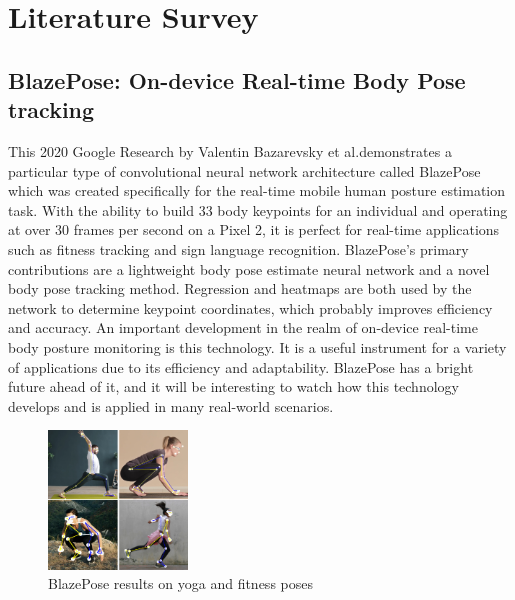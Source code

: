 \documentclass[runningheads]{llncs}
\begin{document}
\section{Literature Survey} %

    \subsection{BlazePose: On-device Real-time Body Pose tracking \parencite{bazarevsky2020blazeposeondevicerealtimebody}}
        This 2020 Google Research by Valentin Bazarevsky et al.\@ demonstrates a particular type of convolutional neural network architecture called BlazePose which was created specifically for the real-time mobile human posture estimation task. 
        With the ability to build 33 body keypoints for an individual and operating at over 30 frames per second on a Pixel 2, it is perfect for real-time applications such as fitness tracking and sign language recognition. BlazePose's primary contributions are a lightweight body pose estimate neural network and a novel body pose tracking method. 
        Regression and heatmaps are both used by the network to determine keypoint coordinates, which probably improves efficiency and accuracy. An important development in the realm of on-device real-time body posture monitoring is this technology. It is a useful instrument for a variety of applications due to its efficiency and adaptability. BlazePose has a bright future ahead of it, and it will be interesting to watch how this technology develops and is applied in many real-world scenarios.
        \begin{figure}[htbp]
            \centering
            \includegraphics[width=0.33\textwidth]{figures/BlazePose.png}
            \caption{BlazePose results on yoga and fitness poses}
        \end{figure}
\end{document}
